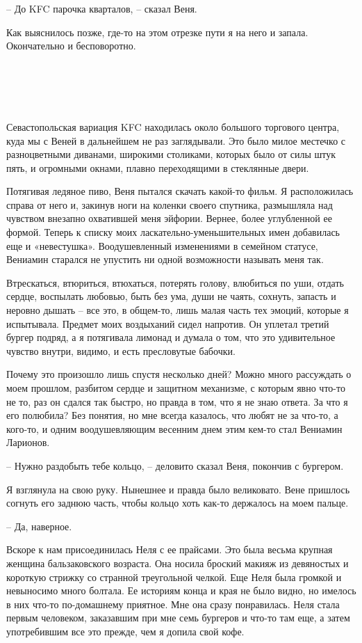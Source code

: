 \documentclass[
]{book}
\begin{document}
-- До KFC парочка кварталов, -- сказал Веня.

Как выяснилось позже, где-то на этом отрезке пути я на него и запала. Окончательно и бесповоротно.

\hypertarget{chapter-14}{%
\chapter{~}\label{chapter-14}}

Севастопольская вариация KFC находилась около большого торгового центра, куда мы с Веней в дальнейшем не раз заглядывали. Это было милое местечко с разноцветными диванами, широкими столиками, которых было от силы штук пять, и огромными окнами, плавно переходящими в стеклянные двери.

Потягивая ледяное пиво, Веня пытался скачать какой-то фильм. Я расположилась справа от него и, закинув ноги на коленки своего спутника, размышляла над чувством внезапно охватившей меня эйфории. Вернее, более углубленной ее формой. Теперь к списку моих ласкательно-уменьшительных имен добавилась еще и «невестушка». Воодушевленный изменениями в семейном статусе, Вениамин старался не упустить ни одной возможности называть меня так.

Втрескаться, втюриться, втюхаться, потерять голову, влюбиться по уши, отдать сердце, воспылать любовью, быть без ума, души не чаять, сохнуть, запасть и неровно дышать -- все это, в общем-то, лишь малая часть тех эмоций, которые я испытывала. Предмет моих воздыханий сидел напротив. Он уплетал третий бургер подряд, а я потягивала лимонад и думала о том, что это удивительное чувство внутри, видимо, и есть пресловутые бабочки.

Почему это произошло лишь спустя несколько дней? Можно много рассуждать о моем прошлом, разбитом сердце и защитном механизме, с которым явно что-то не то, раз он сдался так быстро, но правда в том, что я не знаю ответа. За что я его полюбила? Без понятия, но мне всегда казалось, что любят не за что-то, а кого-то, и одним воодушевляющим весенним днем этим кем-то стал Вениамин Ларионов.

-- Нужно раздобыть тебе кольцо, -- деловито сказал Веня, покончив с бургером.

Я взглянула на свою руку. Нынешнее и правда было великовато. Вене пришлось согнуть его заднюю часть, чтобы кольцо хоть как-то держалось на моем пальце.

-- Да, наверное.

Вскоре к нам присоединилась Неля с ее прайсами. Это была весьма крупная женщина бальзаковского возраста. Она носила броский макияж из девяностых и короткую стрижку со странной треугольной челкой. Еще Неля была громкой и невыносимо много болтала. Ее историям конца и края не было видно, но имелось в них что-то по-домашнему приятное. Мне она сразу понравилась. Неля стала первым человеком, заказавшим при мне семь бургеров и что-то там еще, а затем употребившим все это прежде, чем я допила свой кофе.
\end{document}
